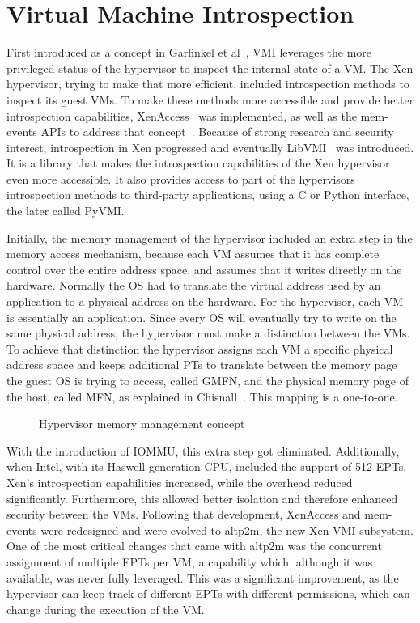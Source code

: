\section{Virtual Machine Introspection}\label{sec:vmi}
First introduced as a concept in Garfinkel et al~\cite{garfinkel2003virtual}, \ac{VMI} leverages the more privileged status of the hypervisor to inspect the internal state of a \ac{VM}. The Xen hypervisor, trying to make that more efficient, included introspection methods to inspect its guest \ac{VM}s. To make these methods more accessible and provide better introspection capabilities, XenAccess~\cite{payne2007secure} was implemented, as well as the mem-events \ac{API}s to address that concept~\cite{lars_2016}. Because of strong research and security interest, introspection in Xen progressed and eventually LibVMI~\cite{payne2011libvmi} was introduced. It is a library that makes the introspection capabilities of the Xen hypervisor even more accessible. It also provides access to part of the hypervisors introspection methods to third-party applications, using a C or Python interface, the later called PyVMI.

\par Initially, the memory management of the hypervisor included an extra step in the memory access mechanism, because each \ac{VM} assumes that it has complete control over the entire address space, and assumes that it writes directly on the hardware. Normally the \ac{OS} had to translate the virtual address used by an application to a physical address on the hardware. For the hypervisor, each \ac{VM} is essentially an application. Since every \ac{OS} will eventually try to write on the same physical address, the hypervisor must make a distinction between the \ac{VM}s. To achieve that distinction the hypervisor assigns each \ac{VM} a specific physical address space and keeps additional \ac{PTs} to translate between the memory page the guest \ac{OS} is trying to access, called \ac{GMFN}, and the physical memory page of the host, called \ac{MFN}, as explained in Chisnall~\cite{chisnall2008definitive}. This mapping is a one-to-one.

\begin{figure}
	\centering
	
	\caption{Hypervisor memory management concept}
	\label{fig:hypmm}
\end{figure}

\par With the introduction of \ac{IOMMU}, this extra step got eliminated. Additionally, when Intel, with its Haswell generation \ac{CPU}, included the support of 512 \ac{EPT}s, Xen’s introspection capabilities increased, while the overhead reduced significantly. Furthermore, this allowed better isolation and therefore enhanced security between the \ac{VM}s. Following that development, XenAccess and mem-events were redesigned and were evolved to altp2m, the new Xen \ac{VMI} subsystem. One of the most critical changes that came with altp2m was the concurrent assignment of multiple \ac{EPT}s per \ac{VM}, a capability which, although it was available, was never fully leveraged. This was a significant improvement, as the hypervisor can keep track of different \ac{EPT}s with different permissions, which can change during the execution of the \ac{VM}.

